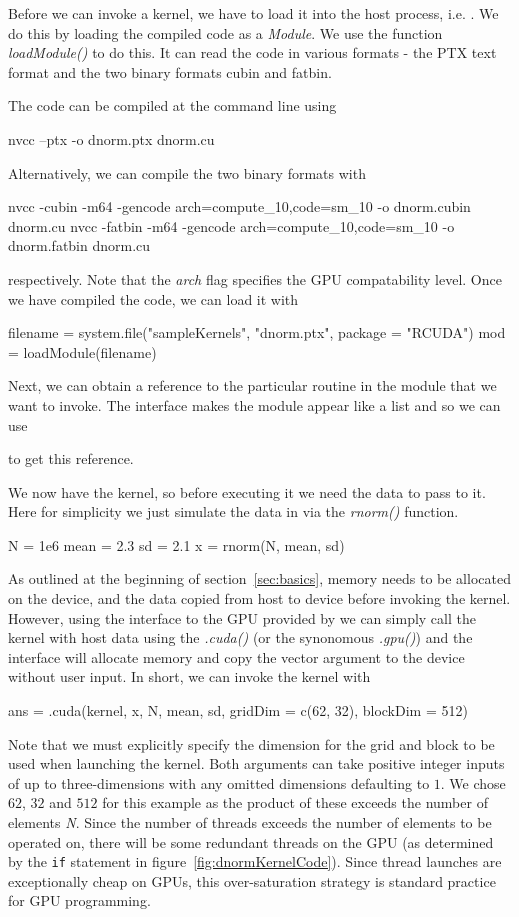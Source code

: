\documentclass[article]{jss}
\def\R{\proglang{R}}
\def\Rpkg#1{\pkg{#1}}
\def\Rfunc#1{\textsl{#1()}}
\def\Rvar#1{\textsl{#1}}
\def\ShFlag#1{\textit{#1}}
\begin{document}
Before we can invoke a kernel, we have to load it into the host
process, i.e. \R.  We do this by loading the compiled code as a
\textit{Module}.  We use the \R{} function \Rfunc{loadModule} to do
this. It can read the code in various formats - the PTX text format
and the two binary formats cubin and fatbin.

The code can be compiled at the command line using 
\begin{ShCode}
nvcc --ptx -o dnorm.ptx dnorm.cu
\end{ShCode}
Alternatively, we can compile the two binary formats with 
\begin{ShCode}
nvcc -cubin -m64 -gencode arch=compute_10,code=sm_10 -o dnorm.cubin dnorm.cu
nvcc -fatbin -m64 -gencode arch=compute_10,code=sm_10 -o dnorm.fatbin dnorm.cu
\end{ShCode}
respectively. Note that the \ShFlag{arch} flag specifies the GPU compatability level. %
Once we have compiled the code, we can load it with
\begin{RCode}
filename = system.file("sampleKernels", "dnorm.ptx", package = "RCUDA")
mod = loadModule(filename)
\end{RCode}
Next, we can obtain a reference to the particular routine in the
module  that we want to invoke.  The \R{} interface makes the module
appear like a list and so we can use
to get this reference.

We now have the kernel, so before executing it we need the data to pass to it. Here for simplicity 
we just simulate the data in \R{} via the \Rfunc{rnorm} function.
\begin{RCode}
N = 1e6
mean = 2.3
sd =  2.1
x = rnorm(N, mean, sd)
\end{RCode}
As outlined at the beginning of section~\ref{sec:basics}, memory needs
to be allocated on the device, and the data copied from host to device 
before invoking the kernel. However, using the \R{} interface to the GPU
provided by \Rpkg{RCUDA} we can simply call the kernel with host data 
using the \Rfunc{.cuda} (or the synonomous \Rfunc{.gpu}) and the 
\R{} interface will allocate memory and copy the \R{} vector
argument to the device without user input. In short, we can invoke the 
kernel with
\begin{RCode}
ans = .cuda(kernel, x, N, mean, sd, gridDim = c(62, 32), blockDim = 512)
\end{RCode}
Note that we must explicitly specify the dimension for the grid and block to be
used when launching the kernel. Both arguments can take positive integer 
inputs of up to three-dimensions with any omitted dimensions defaulting to $1$.
We chose $62$, $32$ and $512$ for this example as the product
of these exceeds the number of elements \Rvar{N}. Since the number of
threads exceeds the number of elements to be operated on, there will be
some redundant threads on the GPU (as determined by the \texttt{if}
statement in figure~\ref{fig:dnormKernelCode}). Since thread launches
are exceptionally cheap on GPUs, this over-saturation strategy is 
standard practice for GPU programming.
\end{document}
